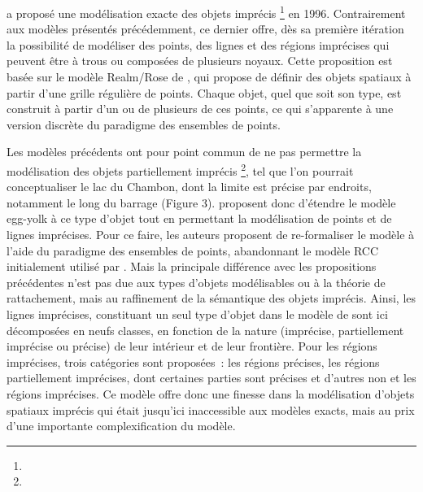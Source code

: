 \textcite{Schneider1996} a proposé une modélisation exacte des objets
imprécis \footnote{} en 1996. Contrairement aux modèles présentés
précédemment, ce dernier offre, dès sa première itération la
possibilité de modéliser des points, des lignes et des régions
imprécises qui peuvent être à trous ou composées de plusieurs
noyaux. Cette proposition est basée sur le modèle Realm/Rose de
\textcite{Guting1995}, qui propose de définir des objets spatiaux à
partir d’une grille régulière de points. Chaque objet, quel que soit
son type, est construit à partir d’un ou de plusieurs de ces points,
ce qui s’apparente à une version discrète du paradigme des ensembles
de points.

Les modèles précédents ont pour point commun de ne pas permettre la
modélisation des objets partiellement imprécis \footnote{}, tel que
l’on pourrait conceptualiser le lac du Chambon, dont la limite est
précise par endroits, notamment le long du barrage (Figure
3). \textcite{Bejaoui2009,Bejaoui2009a} proposent donc d’étendre le
modèle egg-yolk à ce type d’objet tout en permettant la modélisation
de points et de lignes imprécises. Pour ce faire, les auteurs
proposent de re-formaliser le modèle à l’aide du paradigme des
ensembles de points, abandonnant le modèle RCC initialement utilisé
par \textcite{Cohn1996}. Mais la principale différence avec les
propositions précédentes n’est pas due aux types d’objets modélisables
ou à la théorie de rattachement, mais au raffinement de la sémantique
des objets imprécis. Ainsi, les lignes imprécises, constituant un seul
type d’objet dans le modèle de \textcite{Clementini2005} sont ici
décomposées en neufs classes, en fonction de la nature (imprécise,
partiellement imprécise ou précise) de leur intérieur et de leur
frontière. Pour les régions imprécises, trois catégories sont
proposées : les régions précises, les régions partiellement
imprécises, dont certaines parties sont précises et d’autres non et
les régions imprécises. Ce modèle offre donc une finesse dans la
modélisation d’objets spatiaux imprécis qui était jusqu’ici
inaccessible aux modèles exacts, mais au prix d’une importante
complexification du modèle.


